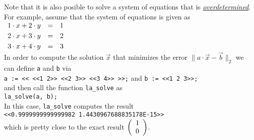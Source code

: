 Note that it is also posible to solve a system of equations that is 
\href{http://en.wikipedia.org/wiki/Overdetermined_system}{\emph{overdetermined}}.  For example,
assume that the system of equations is given as
\\[0.2cm]
\hspace*{1.3cm}
$
\begin{array}[c]{lcl}
  1 \cdot x + 2 \cdot y & = & 1 \\[0.1cm]
  2 \cdot x + 3 \cdot y & = & 2 \\[0.1cm]
  3 \cdot x + 4 \cdot y & = & 3 
\end{array}
$
\\[0.2cm]
In order to compute the solution $\vec{x}$ that minimizes the error
 $\|a \cdot \vec{x} - \vec{b}\|_2$ we can 
define \texttt{a} and \texttt{b} via
\\[0.2cm]
\hspace*{1.3cm}
\texttt{a := << <<1 2>> <<2 3>> <<3 4>> >>;} \quad and \quad \texttt{b := <<1 2 3>>;}
\\[0.2cm]
and then call  the function \texttt{la\_solve} as 
\\[0.2cm]
\hspace*{1.3cm}
\texttt{la\_solve(a, b);}
\\[0.2cm]
In this case, \texttt{la\_solve} computes the result
\\[0.2cm]
\hspace*{1.3cm}
\texttt{<<0.9999999999999982 1.4430967688835178E-15>>}
\\[0.2cm]
which is pretty close to the exact result $\left(\begin{array}[c]{l} 1 \\ 0 \end{array}\right)$.
\vspace*{0.3cm}

